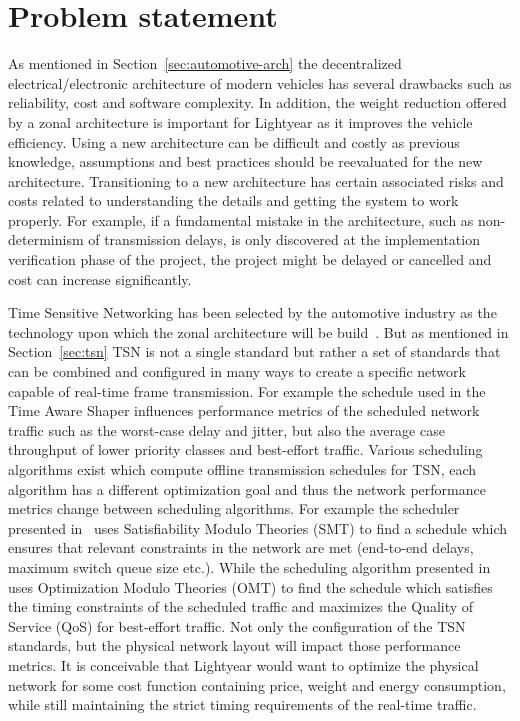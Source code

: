 \section{Problem statement}
\label{sec:problemstatement}
As mentioned in Section~\ref{sec:automotive-arch} the decentralized electrical/electronic architecture of modern vehicles has several drawbacks such as reliability, cost and software complexity. In addition, the weight reduction offered by a zonal architecture is important for Lightyear as it improves the vehicle efficiency. Using a new architecture can be difficult and costly as previous knowledge, assumptions and best practices should be reevaluated for the new architecture. Transitioning to a new architecture has certain associated risks and costs related to understanding the details and getting the system to work properly. For example, if a fundamental mistake in the architecture, such as non-determinism of transmission delays, is only discovered at the implementation verification phase of the project, the project might be delayed or cancelled and cost can increase significantly.

Time Sensitive Networking has been selected by the automotive industry as the technology upon which the zonal architecture will be build~\cite{klaus2019zonal}. But as mentioned in Section~\ref{sec:tsn} TSN is not a single standard but rather a set of standards that can be combined and configured in many ways to create a specific network capable of real-time frame transmission. For example the schedule used in the Time Aware Shaper influences performance metrics of the scheduled network traffic such as the worst-case delay and jitter, but also the average case throughput of lower priority classes and best-effort traffic. Various scheduling algorithms exist which compute offline transmission schedules for TSN, each algorithm has a different optimization goal and thus the network performance metrics change between scheduling algorithms. For example the scheduler presented in~\cite{steiner2010evaluation} uses Satisfiability Modulo Theories (SMT) to find a schedule which ensures that relevant constraints in the network are met (end-to-end delays, maximum switch queue size etc.). While the scheduling algorithm presented in~\cite{houtan2021synthesising} uses Optimization Modulo Theories (OMT) to find the schedule which satisfies the timing constraints of the scheduled traffic and maximizes the Quality of Service (QoS) for best-effort traffic. Not only the configuration of the TSN standards, but the physical network layout will impact those performance metrics. It is conceivable that Lightyear would want to optimize the physical network for some cost function containing price, weight and energy consumption, while still maintaining the strict timing requirements of the real-time traffic. 

